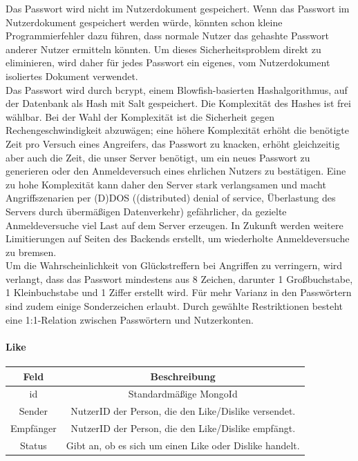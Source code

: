 Das Passwort wird nicht im Nutzerdokument gespeichert. Wenn das Passwort im Nutzerdokument gespeichert werden würde, könnten schon kleine Programmierfehler dazu führen, dass normale Nutzer das gehashte Passwort anderer Nutzer ermitteln könnten. Um dieses Sicherheitsproblem direkt zu eliminieren, wird daher für jedes Passwort ein eigenes, vom Nutzerdokument isoliertes Dokument verwendet.\\
Das Passwort wird durch bcrypt, einem Blowfish-basierten Hashalgorithmus, auf der Datenbank als Hash mit Salt gespeichert. Die Komplexität des Hashes ist frei wählbar. Bei der Wahl der Komplexität ist die Sicherheit gegen Rechengeschwindigkeit abzuwägen; eine höhere Komplexität erhöht die benötigte Zeit pro Versuch eines Angreifers, das Passwort zu knacken, erhöht gleichzeitig aber auch die Zeit, die unser Server benötigt, um ein neues Passwort zu generieren oder den Anmeldeversuch eines ehrlichen Nutzers zu bestätigen. Eine zu hohe Komplexität kann daher den Server stark verlangsamen und macht Angriffszenarien per (D)DOS ((distributed) denial of service, Überlastung des Servers durch übermäßigen Datenverkehr) gefährlicher, da gezielte Anmeldeversuche viel Last auf dem Server erzeugen. In Zukunft werden weitere Limitierungen auf Seiten des Backends erstellt, um wiederholte Anmeldeversuche zu bremsen.\\
Um die Wahrscheinlichkeit von Glückstreffern bei Angriffen zu verringern, wird verlangt, dass das Passwort mindestens aus 8 Zeichen, darunter 1 Großbuchstabe, 1 Kleinbuchstabe und 1 Ziffer erstellt wird. Für mehr Varianz in den Passwörtern sind zudem einige Sonderzeichen erlaubt. Durch gewählte Restriktionen besteht eine 1:1-Relation zwischen Passwörtern und Nutzerkonten.

\paragraph{Like\\}
\begin{center}
    \begin{tabular}{ |c|c| }
        \hline
        Feld & Beschreibung  \\
        \hline
        id & Standardmäßige MongoId \\
        Sender & NutzerID der Person, die den Like/Dislike versendet. \\
        Empfänger &  NutzerID der Person, die den Like/Dislike empfängt. \\
        Status & Gibt an, ob es sich um einen Like oder Dislike handelt. \\
        \hline
    \end{tabular}
\end{center}

